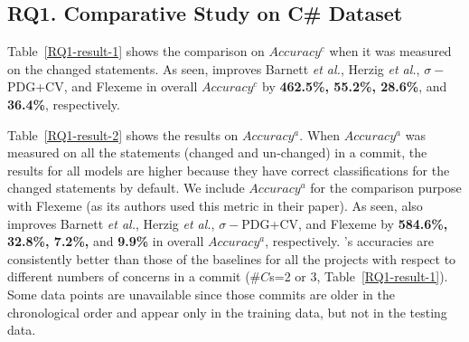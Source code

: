 \subsection{{\bf RQ1. Comparative Study on C\# Dataset}}
\label{rq1:sec}

Table~\ref{RQ1-result-1} shows the comparison on $Accuracy^{c}$ when
it was measured on the changed statements. As seen, {\tool} improves
Barnett {\em et al.}, Herzig {\em et al.}, $\sigma-$PDG+CV, and
Flexeme in overall $Accuracy^c$ by {\bf 462.5\%, 55.2\%, 28.6\%}, and
{\bf 36.4\%}, respectively.

Table~\ref{RQ1-result-2} shows the results on $Accuracy^{a}$. When
$Accuracy^{a}$ was measured on all the statements (changed and
un-changed) in a commit, the results for all models are higher because
they have correct classifications for the changed statements by
default. We include $Accuracy^{a}$ for the comparison purpose with
Flexeme (as its authors used this metric in their paper). As seen,
{\tool} also improves Barnett {\em et al.}, Herzig {\em et al.},
$\sigma-$PDG+CV, and Flexeme by {\bf 584.6\%, 32.8\%, 7.2\%,} and {\bf
9.9\%} in overall $Accuracy^{a}$, respectively. {\tool}'s accuracies
are consistently better than those of the baselines for all the
projects with respect to different numbers of concerns in a commit
($\#C$s=2 or 3, Table~\ref{RQ1-result-1}). Some data points are
unavailable since those commits are older in the chronological order
and appear only in the training data, but not in the testing data.


